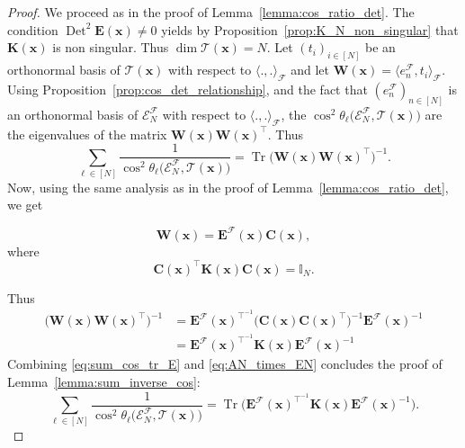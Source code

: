 \documentclass[twoside,11pt]{book}
\numberwithin{theorem}{chapter}
\numberwithin{definition}{chapter}
\numberwithin{proposition}{chapter}
\numberwithin{corollary}{chapter}
\numberwithin{example}{chapter}
\numberwithin{lemma}{chapter}
\DeclareMathOperator{\Tr}{Tr}
\DeclareMathOperator{\Det}{Det}
\DeclareMathOperator{\Tran}{\intercal}
\begin{document}
\begin{proof}
We proceed as in the proof of Lemma~\ref{lemma:cos_ratio_det}. 
The condition $\Det^{2} \bm{E}(\bm{x}) \neq 0$ yields by Proposition~\ref{prop:K_N_non_singular} that $\bm{K}(\bm{x})$ is non singular. Thus $\dim \mathcal{T}(\bm{x}) = N$. Let $(t_{i})_{i \in [N]}$ be an orthonormal basis of $\mathcal{T}(\bm{x})$ with respect to $\langle ., . \rangle_{\mathcal{F}}$ and let $\bm{W}(\bm{x}) = \langle e_{n}^{\mathcal{F}}, t_{i} \rangle_{\mathcal{F}}$.
%
Using Proposition~\ref{prop:cos_det_relationship}, and the fact that $(e_{n}^{\mathcal{F}})_{n \in [N]}$ is an orthonormal basis of $\mathcal{E}^{\mathcal{F}}_{N}$ with respect to $\langle ., . \rangle_{\mathcal{F}}$, the $\cos^{2} \theta_{\ell} \bigg(\mathcal{E}^{\mathcal{F}}_{N}, \mathcal{T}(\bm{x}) \bigg)$ are the eigenvalues of the matrix $\bm{W}(\bm{x})\bm{W}(\bm{x})^{\Tran}$. Thus
\begin{equation}\label{eq:sum_cos_tr_E}
\sum\limits_{\ell \in [N]} \frac{1}{\cos^{2} \theta_{\ell} \bigg(\mathcal{E}^{\mathcal{F}}_{N}, \mathcal{T}(\bm{x}) \bigg)} = \Tr \bigg( \bm{W}(\bm{x})\bm{W}(\bm{x})^{\Tran} \bigg)^{-1}.
\end{equation}
Now, using the same analysis as in the proof of Lemma~\ref{lemma:cos_ratio_det}, we get 


\begin{equation}
\bm{W}(\bm{x}) = \bm{E}^{\mathcal{F}}(\bm{x})\bm{C}(\bm{x}) ,
\end{equation}
where
\begin{equation}
\bm{C}(\bm{x})^{\Tran} \bm{K}(\bm{x}) \bm{C}(\bm{x}) = \mathbb{I}_{N}.
\end{equation}

%
Thus
\begin{align}\label{eq:AN_times_EN}
\bigg( \bm{W}(\bm{x})\bm{W}(\bm{x})^{\Tran} \bigg)^{-1} & = \bm{E}^{\mathcal{F}}(\bm{x})^{\Tran^{-1}} \bigg( \bm{C}(\bm{x})\bm{C}(\bm{x})^{\Tran} \bigg)^{-1}  \bm{E}^{\mathcal{F}}(\bm{x})^{-1} \nonumber \\
& = \bm{E}^{\mathcal{F}}(\bm{x})^{\Tran^{-1}} \bm{K}(\bm{x}) \bm{E}^{\mathcal{F}}(\bm{x})^{-1}
\end{align}
Combining \eqref{eq:sum_cos_tr_E} and \eqref{eq:AN_times_EN} concludes the proof of Lemma~\ref{lemma:sum_inverse_cos}:
\begin{equation}
\sum\limits_{\ell \in [N]} \frac{1}{\cos^{2} \theta_{\ell} \bigg(\mathcal{E}^{\mathcal{F}}_{N}, \mathcal{T}(\bm{x}) \bigg)} = \Tr \bigg(\bm{E}^{\mathcal{F}}(\bm{x})^{\Tran^{-1}} \bm{K}(\bm{x})  \bm{E}^{\mathcal{F}}(\bm{x})^{-1} \bigg).
\end{equation}
\end{proof}
\end{document}

